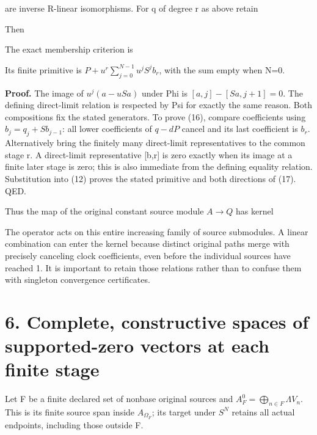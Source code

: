 are inverse R-linear isomorphisms. For q of degree r as above retain


Then


The exact membership criterion is


Its finite primitive is \(P+u^r\sum_{j=0}^{N-1}u^jS^j b_r\), with the
sum empty when N=0.

\textbf{Proof.} The image of \(u^j(a-uSa)\) under Phi is
\([a,j]-[Sa,j+1]=0\). The defining direct-limit relation is respected by
Psi for exactly the same reason. Both compositions fix the stated
generators. To prove (16), compare coefficients using
\(b_j=q_j+Sb_{j-1}\): all lower coefficients of \(q-dP\) cancel and its
last coefficient is \(b_r\). Alternatively bring the finitely many
direct-limit representatives to the common stage r. A direct-limit
representative {[}b,r{]} is zero exactly when its image at a finite
later stage is zero; this is also immediate from the defining equality
relation. Substitution into (12) proves the stated primitive and both
directions of (17). QED.

Thus the map of the original constant source module \(A\to Q\) has
kernel


The operator acts on this entire increasing family of source submodules.
A linear combination can enter the kernel because distinct original
paths merge with precisely canceling clock coefficients, even before the
individual sources have reached 1. It is important to retain those
relations rather than to confuse them with singleton convergence
certificates.

\section{6. Complete, constructive spaces of supported-zero vectors at
each finite stage}

Let F be a finite declared set of nonbase original sources and
\(A_F^0=\bigoplus_{n\in F}\Lambda V_n\). This is its finite source span
inside \(A_{\Omega_F}\); its target under \(S^N\) retains all actual
endpoints, including those outside F.

